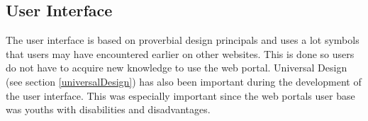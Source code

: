 \subsection{User Interface}
The user interface is based on proverbial design principals and uses a lot symbols that users may have encountered earlier on other websites. This is done so users do not have to acquire new knowledge to use the web portal. Universal Design (see section \ref{universalDesign}) has also been important during the development of the user interface. This was especially important since the web portals user base was youths with disabilities and disadvantages. 
\cleardoublepage